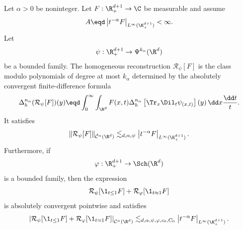 \begin{proposition}
  \label{prop:holder-reconstruction}
  Let \(\alpha > 0\) be noninteger. Let
  \(F : \R^{d + 1}_+ \to \C\) be measurable and assume
  \begin{equation}
    \label{eq:holder-reconstruction-size-assumption}
    A \eqd
    \left|t^{-\alpha}F\right|_{L^{\infty}(\R^{d + 1}_+)}
    < \infty.
  \end{equation}
  Let
  \[
    \psi : \R^{d + 1}_+ \to \Psi^{k_{\alpha}}(\R^d)
  \]
  be a bounded family. The homogeneous reconstruction
  \(\mathcal{R}_{\psi}[F]\) is the class modulo polynomials of degree at most
  \(k_{\alpha}\) determined by the absolutely convergent finite-difference
  formula
  \begin{equation}
    \label{eq:homogeneous-reconstruction-increment}
    \Delta_h^{n_{\alpha}}(\mathcal{R}_{\psi}[F])(y)
    \eqd
    \int_0^{\infty} \int_{\R^d}
    F(x, t)
    \Delta_h^{n_{\alpha}}
    \left[\Tr_x \Dil_t \psi_{(x, t)}\right](y)
    \, \dd x \frac{\dd t}{t}.
  \end{equation}
  It satisfies
  \begin{equation}
    \label{eq:holder-reconstruction-homogeneous}
    \|\mathcal{R}_{\psi}[F]\|_{\dot{\mathcal{C}}^{\alpha}(\R^d)}
    \lesssim_{d, \alpha, \psi}
    \left|t^{-\alpha}F\right|_{L^{\infty}(\R^{d + 1}_+)}.
  \end{equation}
  Furthermore, if
  \[
    \varphi : \R^{d + 1}_+ \to \Sch(\R^d)
  \]
  is a bounded family, then the expression
  \[
    \mathcal{R}_{\psi}[\1_{t \le 1}F]
    +
    \mathcal{R}_{\varphi}[\1_{t \approx 1}F]
  \]
  is absolutely convergent pointwise and satisfies
  \begin{equation}
    \label{eq:holder-reconstruction-nonhomogeneous}
    \left|
      \mathcal{R}_{\psi}[\1_{t \le 1}F]
      +
      \mathcal{R}_{\varphi}[\1_{t \approx 1}F]
    \right|_{\mathcal{C}^{\alpha}(\R^d)}
    \lesssim_{d, \alpha, \psi, \varphi, c_0, C_0}
    \left|t^{-\alpha}F\right|_{L^{\infty}(\R^{d + 1}_+)}.
  \end{equation}
\end{proposition}

{} {}

